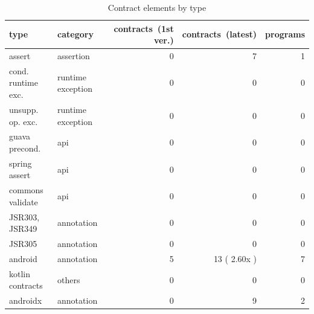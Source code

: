\begin{table}[]
\centering
\caption{Contract elements by type}
\label{tab:contractsbytype}
\begin{tabular}{|p{5cm}|p{3cm}|r|r|r|} \hline
   type & category & \parbox{1.2cm}{contracts\ (1st ver.)}  & \parbox{1.2cm}{contracts\ (latest)} & pro\-grams \\ \hline
	assert &  assertion &  0 &  7 &  1 \\ 
	cond. runtime exc. &  runtime exception &  0 &  0 &  0 \\ 
	unsupp. op. exc. &  runtime exception &  0 &  0 &  0 \\ 
	guava precond. &  api &  0 &  0 &  0 \\ 
	spring assert &  api &  0 &  0 &  0 \\ 
	commons validate &  api &  0 &  0 &  0 \\ 
	JSR303, JSR349 &  annotation &  0 &  0 &  0 \\ 
	JSR305 &  annotation &  0 &  0 &  0 \\ 
	android &  annotation &  5 &  13 ( 2.60x ) &  7 \\ 
	kotlin contracts &  others &  0 &  0 &  0 \\ 
	androidx &  annotation &  0 &  9 &  2 \\ 
\hline
\end{tabular}
\end{table}
